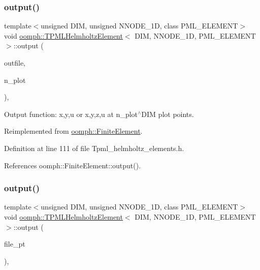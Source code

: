\subsubsection{\texorpdfstring{output()}{output()}\hspace{0.1cm}{\footnotesize\ttfamily [2/4]}}
{\footnotesize\ttfamily template$<$unsigned D\+IM, unsigned N\+N\+O\+D\+E\+\_\+1D, class P\+M\+L\+\_\+\+E\+L\+E\+M\+E\+NT$>$ \\
void \hyperlink{classoomph_1_1TPMLHelmholtzElement}{oomph\+::\+T\+P\+M\+L\+Helmholtz\+Element}$<$ D\+IM, N\+N\+O\+D\+E\+\_\+1D, P\+M\+L\+\_\+\+E\+L\+E\+M\+E\+NT $>$\+::output (\begin{DoxyParamCaption}\item[{std\+::ostream \&}]{outfile,  }\item[{const unsigned \&}]{n\+\_\+plot }\end{DoxyParamCaption})\hspace{0.3cm}{\ttfamily [inline]}, {\ttfamily [virtual]}}



Output function\+: x,y,u or x,y,z,u at n\+\_\+plot$^\wedge$\+D\+IM plot points. 



Reimplemented from \hyperlink{classoomph_1_1FiniteElement_afa9d9b2670f999b43e6679c9dd28c457}{oomph\+::\+Finite\+Element}.



Definition at line 111 of file Tpml\+\_\+helmholtz\+\_\+elements.\+h.



References oomph\+::\+Finite\+Element\+::output().

\mbox{\label{classoomph_1_1TPMLHelmholtzElement_a71d5ae7a30f3f20a89fa20f5b84e2bef}} 
\subsubsection{\texorpdfstring{output()}{output()}\hspace{0.1cm}{\footnotesize\ttfamily [3/4]}}
{\footnotesize\ttfamily template$<$unsigned D\+IM, unsigned N\+N\+O\+D\+E\+\_\+1D, class P\+M\+L\+\_\+\+E\+L\+E\+M\+E\+NT$>$ \\
void \hyperlink{classoomph_1_1TPMLHelmholtzElement}{oomph\+::\+T\+P\+M\+L\+Helmholtz\+Element}$<$ D\+IM, N\+N\+O\+D\+E\+\_\+1D, P\+M\+L\+\_\+\+E\+L\+E\+M\+E\+NT $>$\+::output (\begin{DoxyParamCaption}\item[{F\+I\+LE $\ast$}]{file\+\_\+pt }\end{DoxyParamCaption})\hspace{0.3cm}{\ttfamily [inline]}, {\ttfamily [virtual]}}



